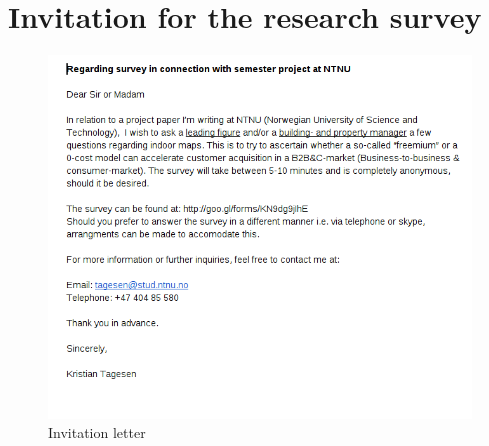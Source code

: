 \chapter{Invitation for the research survey}

\begin{figure}[H]
\centering
\includegraphics[width=15cm]{figs/snapshot46.png}
\caption{Invitation letter}
\label{fig:invitation_letter}
\end{figure}
